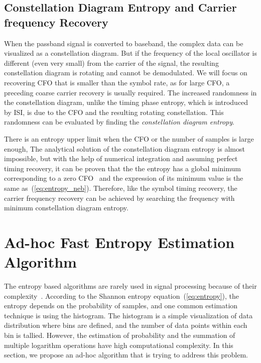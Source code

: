 \documentclass[journal,comsoc]{IEEEtran}
\begin{document}
\subsection{Constellation Diagram Entropy and Carrier frequency Recovery}
\label{sec:const_entp}
When the passband signal is converted to baseband, the complex data can be visualized as a constellation diagram.
But if the frequency of the local oscillator is  different (even very small) from the carrier of the signal, the resulting constellation diagram is rotating and cannot be demodulated.
We will focus on recovering CFO that is smaller than the symbol rate, as for large CFO, a preceding coarse carrier recovery is usually required.
The increased randomness in the constellation diagram, unlike the timing phase entropy, which is introduced by ISI, is due to the CFO and the resulting rotating constellation.
This randomness can be evaluated by finding the \textit{constellation diagram entropy}.

There is an entropy upper limit when the CFO or the number of samples is large enough,
The analytical solution of the constellation diagram entropy is almost impossible,
but with the help of  numerical integration and assuming perfect timing recovery, it can be proven that the the entropy has a global minimum corresponding to a zero CFO~\cite{Pedzisz2006} and the expression of its minimum value is the same as~(\ref{eq:entropy_neb}).
Therefore, like the symbol timing recovery, the carrier frequency recovery can be achieved by searching the frequency with minimum constellation diagram entropy.


\section{Ad-hoc Fast Entropy Estimation Algorithm}
\label{sec:adhoc}
The entropy based algorithms are rarely used in signal processing because of their complexity~\cite{Bercher2000}.
According to the Shannon entropy equation~(\ref{eq:entropy}), the entropy depends on the probability of samples, and one common estimation technique is using the histogram.
The histogram is a simple visualization of data distribution where bins are defined, and the number of data points within each bin is tallied. 
However, the estimation of probability and the summation of multiple logarithm operations have high computational complexity.
In this section, we propose an ad-hoc algorithm that is trying to address this problem. 
\end{document}
